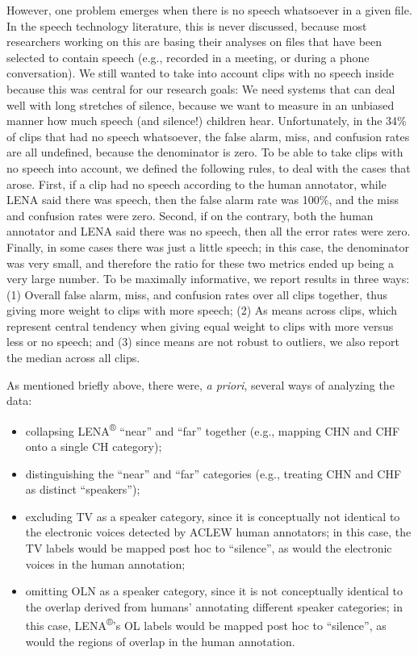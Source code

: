 \documentclass[english,table,man,floatsintext]{apa6}
\providecommand{\tightlist}{%
  \setlength{\itemsep}{0pt}\setlength{\parskip}{0pt}}
\begin{document}
However, one problem emerges when there is no speech whatsoever in a given file. In the speech technology literature, this is never discussed, because most researchers working on this are basing their analyses on files that have been selected to contain speech (e.g., recorded in a meeting, or during a phone conversation). We still wanted to take into account clips with no speech inside because this was central for our research goals: We need systems that can deal well with long stretches of silence, because we want to measure in an unbiased manner how much speech (and silence!) children hear. Unfortunately, in the 34\% of clips that had no speech whatsoever, the false alarm, miss, and confusion rates are all undefined, because the denominator is zero.
To be able to take clips with no speech into account, we defined the following rules, to deal with the cases that arose. First, if a clip had no speech according to the human annotator, while LENA said there was speech, then the false alarm rate was 100\%, and the miss and confusion rates were zero. Second, if on the contrary, both the human annotator and LENA said there was no speech, then all the error rates were zero. Finally, in some cases there was just a little speech; in this case, the denominator was very small, and therefore the ratio for these two metrics ended up being a very large number. To be maximally informative, we report results in three ways: (1) Overall false alarm, miss, and confusion rates over all clips together, thus giving more weight to clips with more speech; (2) As means across clips, which represent central tendency when giving equal weight to clips with more versus less or no speech; and (3) since means are not robust to outliers, we also report the median across all clips.

As mentioned briefly above, there were, \emph{a priori}, several ways of analyzing the data:

\begin{itemize}
\tightlist
\item
  collapsing LENA\textsuperscript{®} \enquote{near} and \enquote{far} together (e.g., mapping CHN and CHF onto a single CH category);
\item
  distinguishing the \enquote{near} and \enquote{far} categories (e.g., treating CHN and CHF as distinct \enquote{speakers});
\item
  excluding TV as a speaker category, since it is conceptually not identical to the electronic voices detected by ACLEW human annotators; in this case, the TV labels would be mapped post hoc to \enquote{silence}, as would the electronic voices in the human annotation;
\item
  omitting OLN as a speaker category, since it is not conceptually identical to the overlap derived from humans' annotating different speaker categories; in this case, LENA\textsuperscript{®}'s OL labels would be mapped post hoc to \enquote{silence}, as would the regions of overlap in the human annotation.
\end{itemize}
\end{document}
